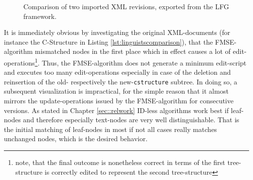 \begin{figure}
\centering
{}
\caption{Comparison of two imported XML revisions, exported from the LFG framework.}
\end{figure}


It is immediately obvious by investigating the original XML-documents (for instance the C-Structure in Listing \ref{lst:linguistscomparison}), that the FMSE-algorithm mismatched nodes in the first place which in effect causes a lot of edit-operations\footnote{note, that the final outcome is nonetheless correct in terms of the first tree-structure is correctly edited to represent the second tree-structure}. Thus, the FMSE-algorithm does not generate a minimum edit-script and executes too many edit-operations especially in case of the deletion and reinsertion of the old- respectively the new-\texttt{cstructure} subtree. In doing so, a subsequent visualization is impractical, for the simple reason that it almost mirrors the update-operations issued by the FMSE-algorithm for consecutive versions. As stated in Chapter \ref{sec::relwork} ID-less algorithms work best if leaf-nodes and therefore especially text-nodes are very well distinguishable. That is the initial matching of leaf-nodes in most if not all cases really matches unchanged nodes, which is the desired behavior. 

